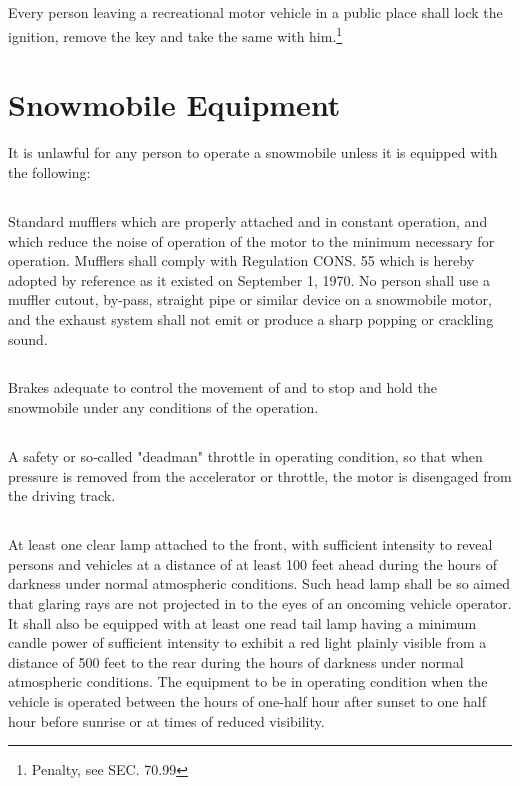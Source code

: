 \subsection{}
Every person leaving a recreational motor vehicle in a public place shall lock the ignition, remove the key and take the same with him.\footnote{Penalty, see SEC. 70.99}

\section{Snowmobile Equipment}
It is unlawful for any person to operate a snowmobile unless it is equipped with the following:
\subsection{}
Standard mufflers which are properly attached and in constant operation, and which reduce the noise of operation of the motor to the minimum necessary for operation. Mufflers shall comply with Regulation CONS. 55 which is hereby adopted by reference as it existed on September 1, 1970. No person shall use a muffler cut­out, by‑pass, straight pipe or similar device on a snowmobile motor, and the exhaust system shall not emit or produce a sharp popping or crackling sound.
\subsection{}
Brakes adequate to control the movement of and to stop and hold the snowmobile under any conditions of the operation.
\subsection{}
A safety or so‑called "deadman" throttle in operating condition, so that when pressure is removed from the accelerator or throttle, the motor is disengaged from the driving track.
\subsection{}
At least one clear lamp attached to the front, with sufficient intensity to reveal persons and vehicles at a distance of at least 100 feet ahead during the hours of darkness under normal atmospheric conditions. Such head lamp shall be so aimed that glaring rays are not projected in to the eyes of an oncoming vehicle operator. It shall also be equipped with at least one read tail lamp having a minimum candle power of sufficient intensity to exhibit a red light plainly visible from a distance of 500 feet to the rear during the hours of darkness under normal atmospheric conditions. The equipment to be in operating condition when the vehicle is operated between the hours of one-half hour after sunset to one half hour before sunrise or at times of reduced visibility.
